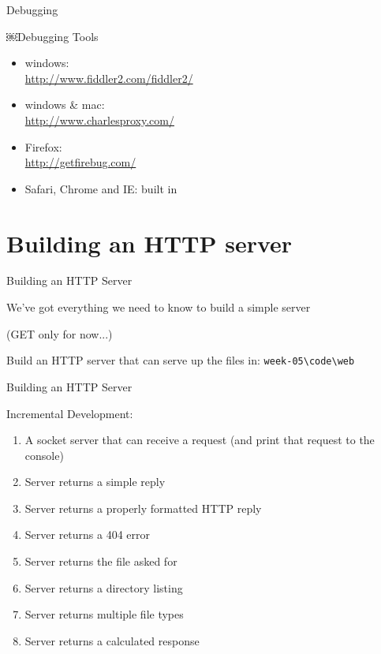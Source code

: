 \documentclass{beamer}
\begin{document}
\begin{frame}[fragile]{Debugging}

{\Large￼Debugging Tools}

\begin{itemize}
  \item windows:\\
    \url{http://www.fiddler2.com/fiddler2/}
  \item windows \& mac:\\
    \url{http://www.charlesproxy.com/}
  \item Firefox:\\ 
    \url{http://getfirebug.com/}
  \item Safari, Chrome and IE: built in
\end{itemize}

\end{frame}

\section{Building an HTTP server}

\begin{frame}[fragile]{Building an HTTP Server}

\vfill
{\Large We've got everything we need to know to build a simple server}

\vfill
(GET only for now...)

\vfill
{\LARGE Build an HTTP server that can serve up the files in:
\verb|week-05\code\web|}\\

\end{frame}



\begin{frame}{Building an HTTP Server}

{\Large Incremental Development:}
\begin{enumerate}
  \item A socket server that can receive a request (and print that request to the console)
  \item Server returns a simple reply
  \item Server returns a properly formatted HTTP reply
  \item Server returns a 404 error
  \item Server returns the file asked for
  \item Server returns a directory listing
  \item Server returns multiple file types
  \item Server returns a calculated response
\end{enumerate}

\end{frame}
\end{document}
